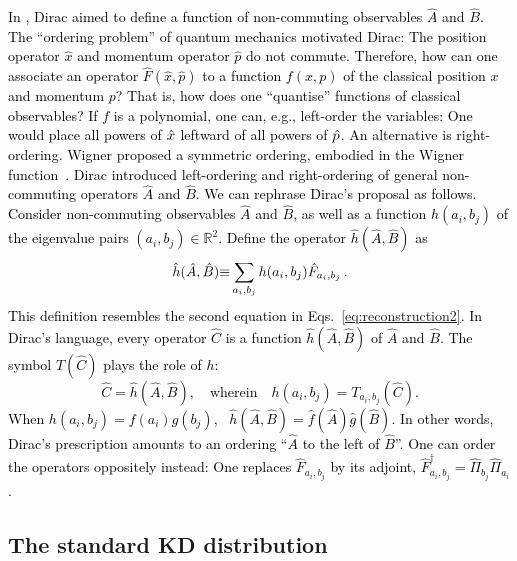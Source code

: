 \documentclass[%
 reprint,
superscriptaddress,
nofootinbib,
bibnotes,
 amsmath,amssymb,
 aps,
]{revtex4-1}
\theoremstyle{plain}
\newcommand{\Dave}[1]{\textcolor{black}{#1} }
\newcommand{\nicole}[1]{\textcolor{black}{#1} }
\newcommand{\R}{\mathbb{R}}
\begin{document}
\nicole{
 In \cite{Dirac45},  Dirac
 \nicole{aimed to define} a function of non-commuting observables $\hat{A}$ and $\hat{B}$. The ``ordering problem'' of quantum mechanics motivated Dirac: The position operator $\hat x$ and momentum operator $\hat p$ do not commute. Therefore, how can one associate an operator $\hat F(\hat x,\hat p)$ to a function $f(x,p)$ of the classical position $x$ and momentum $p$?  That is, how does one ``quantise'' functions of classical observables? If $f$ is a polynomial, one can,
 e.g., left-order the variables: One would place all powers of $\Dave{\hat{x}}$ leftward of all powers of $\Dave{{\hat{p}}}$. An alternative is right-ordering. Wigner proposed a symmetric ordering, embodied in the  Wigner function~\cite{Wigner32}. Dirac 
\Dave{introduced} left-ordering and right-ordering \Dave{of} general \Dave{non-}commuting operators $\hat A$ and $\hat B$. 
\nicole{We can rephrase Dirac's proposal as follows.}
Consider non-commuting observables $\hat A$ and $\hat B$, as well as a function $h(a_i,b_j)$ of the eigenvalue pairs $(a_i,b_j)\in\R^2$. 
\nicole{Define the operator}
$\hat h(\hat A,\hat B)$ \nicole{as}
 \begin{equation}\label{eq:Dirac_functionAB}
     \hat h(\hat A,\hat B) 
     \nicole{\equiv}  \sum_{a_i,b_j} h(a_i, b_j) \hat F_{a_i, b_j} \, .
 \end{equation}
\nicole{This definition resembles}
the second equation in Eqs.~\eqref{eq:reconstruction2}. In Dirac's language, every operator $\hat C$ %
\nicole{is} a function $\hat h(\hat A,\hat B)$ of %
$\hat A$ and $\hat B$. The symbol $T(\hat C)$ plays the role of $h$:
\begin{equation}\label{eq:diracformula}
    \hat C=\hat h(\hat A,\hat B), 
    \quad \textrm{wherein} \quad  
    h(a_i, b_j)=T_{a_i,b_j}(\hat C).
\end{equation}
When $h(a_i, b_j)=f(a_i)g(b_j)$, \,
$\hat h(\hat A,\hat B)=\hat f(\hat A)\hat g(\hat B)$. In other words, Dirac's prescription amounts to an ordering ``$\hat A$ to the left of $\hat B$''. 
\nicole{One can order the operators oppositely instead: One replaces}
$\hat F_{a_i,b_j}$ by its adjoint, $\hat F^\dagger_{a_i,b_j}=\hat\Pi_{b_j}\hat \Pi_{a_i}$. 
}





\subsection{The standard KD distribution}
\label{SubSec:Standard}
\end{document}
